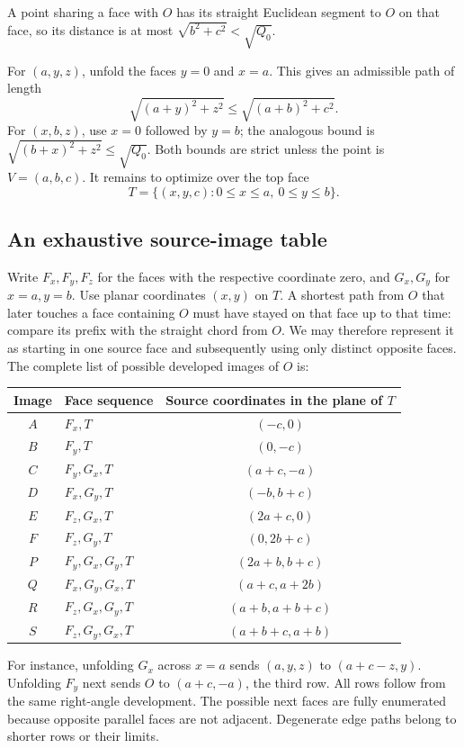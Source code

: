 \documentclass[11pt]{article}
\theoremstyle{definition}
\newcommand{\sqzero}{Q_0}
\begin{document}
A point sharing a face with \(O\) has its straight Euclidean segment
to \(O\) on that face, so its distance is at most
\(\sqrt{b^2+c^2}<\sqrt{\sqzero}\).

For \((a,y,z)\), unfold the faces \(y=0\) and \(x=a\).
This gives an admissible path of length
\[
\sqrt{(a+y)^2+z^2}\le\sqrt{(a+b)^2+c^2}.
\]
For \((x,b,z)\), use \(x=0\) followed by \(y=b\); the analogous
bound is \(\sqrt{(b+x)^2+z^2}\le\sqrt{\sqzero}\).
Both bounds are strict unless the point is \(V=(a,b,c)\).
It remains to optimize over the top face
\[
T=\{(x,y,c):0\le x\le a,\ 0\le y\le b\}.
\]

\subsection{An exhaustive source-image table}

Write \(F_x,F_y,F_z\) for the faces with the respective coordinate
zero, and \(G_x,G_y\) for \(x=a,y=b\). Use planar coordinates
\((x,y)\) on \(T\). A shortest path from \(O\) that later touches a
face containing \(O\) must have stayed on that face up to that time:
compare its prefix with the straight chord from \(O\). We may therefore
represent it as starting in one source face and subsequently using only
distinct opposite faces. The complete list of possible developed
images of \(O\) is:

\begin{center}
\begin{tabular}{c l c}
\toprule
Image&Face sequence&Source coordinates in the plane of \(T\)\\
\midrule
\(A\)&\(F_x,T\)&\((-c,0)\)\\
\(B\)&\(F_y,T\)&\((0,-c)\)\\
\(C\)&\(F_y,G_x,T\)&\((a+c,-a)\)\\
\(D\)&\(F_x,G_y,T\)&\((-b,b+c)\)\\
\(E\)&\(F_z,G_x,T\)&\((2a+c,0)\)\\
\(F\)&\(F_z,G_y,T\)&\((0,2b+c)\)\\
\(P\)&\(F_y,G_x,G_y,T\)&\((2a+b,b+c)\)\\
\(Q\)&\(F_x,G_y,G_x,T\)&\((a+c,a+2b)\)\\
\(R\)&\(F_z,G_x,G_y,T\)&\((a+b,a+b+c)\)\\
\(S\)&\(F_z,G_y,G_x,T\)&\((a+b+c,a+b)\)\\
\bottomrule
\end{tabular}
\end{center}

For instance, unfolding \(G_x\) across \(x=a\) sends
\((a,y,z)\) to \((a+c-z,y)\). Unfolding \(F_y\) next sends \(O\)
to \((a+c,-a)\), the third row. All rows follow from the same
right-angle development. The possible next faces are fully enumerated
because opposite parallel faces are not adjacent. Degenerate edge
paths belong to shorter rows or their limits.
\end{document}
